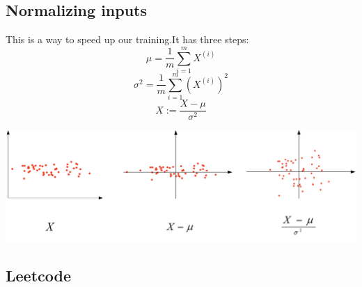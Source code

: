 \documentclass[10pt]{article}
\begin{document}
 \subsection{Normalizing inputs}
 \begin{flushleft}
 This is a way to speed up our training.It has three steps:
 $$\mu=\frac{1}{m} \sum_{i=1}^{m}X^{(i)}$$
 $$\sigma^{2} = \frac{1}{m}\sum_{i=1}^{m}(X^{(i)})^2$$
 $$X:=\frac{X-\mu}{\sigma^{2}}$$     
 \begin{center}
 \includegraphics[scale=0.6]{guiyi.jpg}
 \end{center}
 
 \end{flushleft}
 
 
 
 \begin{center}
 \section{Leetcode}
 \end{center}
\end{document}
